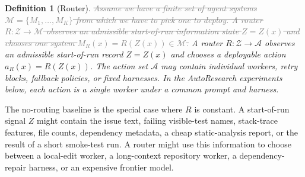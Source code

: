 \documentclass{article}
\newcommand{\oldtext}[1]{\textcolor{gray}{\sout{#1}}}
\newcommand{\newtext}[1]{\textcolor{green!50!black}{#1}}
\newtheorem{definition}{Definition}
\newcommand{\cM}{\mathcal{M}}
\begin{document}
\begin{definition}[Router]
\label{def:router}
\oldtext{Assume we have a finite set of agent systems \(\cM=\{M_1,\ldots,M_K\}\) from which we have to pick one to deploy. A router \(R:\mathcal Z\to\cM\) observes an admissible start-of-run information state \(Z=Z(x)\) and chooses one system \(M_R(x)=R(Z(x))\in\mathcal M\).}
\newtext{A router \(R:\mathcal Z\to\mathcal A\) observes an admissible start-of-run record \(Z=Z(x)\) and chooses a deployable action \(a_R(x)=R(Z(x))\). The action set \(\mathcal A\) may contain individual workers, retry blocks, fallback policies, or fixed harnesses. In the AutoResearch experiments below, each action is a single worker under a common prompt and harness.}
\end{definition}
The no-routing baseline is the special case where \(R\) is constant.
A start-of-run signal \(Z\) might contain the issue text, failing visible-test names, stack-trace features, file counts, dependency metadata, a cheap static-analysis report, or the result of a short smoke-test run.
A router might use this information to choose between a local-edit worker, a long-context repository worker, a dependency-repair harness, or an expensive frontier model.
\end{document}
